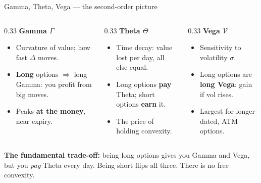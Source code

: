 \documentclass[11pt,aspectratio=169]{beamer}
\newcommand{\keybox}[1]{%
  \begin{beamercolorbox}[wd=\textwidth,sep=0.6em,rounded=true]{}%
    \colorbox{soft}{\parbox{\dimexpr\textwidth-1.4em}{\color{ink}#1}}%
  \end{beamercolorbox}}
\begin{document}
\begin{frame}{Gamma, Theta, Vega — the second-order picture}
  \begin{columns}[T]
    \begin{column}{0.33\textwidth}
      \textbf{\color{accent}Gamma $\Gamma$}
      \begin{itemize}\small
        \item Curvature of value; how fast $\Delta$ moves.
        \item \textbf{Long} options $\Rightarrow$ long Gamma: you profit from big moves.
        \item Peaks \textbf{at the money}, near expiry.
      \end{itemize}
    \end{column}
    \begin{column}{0.33\textwidth}
      \textbf{\color{accent}Theta $\Theta$}
      \begin{itemize}\small
        \item Time decay: value lost per day, all else equal.
        \item Long options \textbf{pay} Theta; short options \textbf{earn} it.
        \item The price of holding convexity.
      \end{itemize}
    \end{column}
    \begin{column}{0.33\textwidth}
      \textbf{\color{accent}Vega $\mathcal{V}$}
      \begin{itemize}\small
        \item Sensitivity to volatility $\sigma$.
        \item Long options are \textbf{long Vega}: gain if vol rises.
        \item Largest for longer-dated, ATM options.
      \end{itemize}
    \end{column}
  \end{columns}
  \vspace{0.6em}
  \keybox{\textbf{The fundamental trade-off:} being long options gives you Gamma and Vega, but you \emph{pay} Theta every day. Being short flips all three. There is no free convexity.}
\end{frame}
\end{document}
